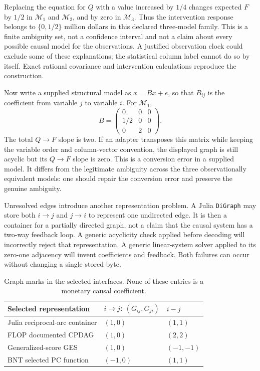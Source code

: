 Replacing the equation for $Q$ with a value increased by $1/4$ changes
expected $F$ by $1/2$ in $\mathcal M_1$ and $\mathcal M_2$, and by zero in
$\mathcal M_3$. Thus the intervention response belongs to
$\{0,1/2\}$ million dollars in this declared three-model family. This is a
finite ambiguity set, not a confidence interval and not a claim about every
possible causal model for the observations. A justified observation clock
could exclude some of these explanations; the statistical column label
cannot do so by itself. Exact rational covariance and intervention
calculations reproduce the construction\citep{exec13_other_exact}.

Now write a supplied structural model as $x=Bx+e$, so that $B_{ij}$ is the
coefficient from variable $j$ to variable $i$. For $\mathcal M_1$,
\[
 B=\begin{pmatrix}0&0&0\\1/2&0&0\\0&2&0\end{pmatrix}.
\]
The total $Q\to F$ slope is two. If an adapter transposes this matrix while
keeping the variable order and column-vector convention, the displayed graph
is still acyclic but its $Q\to F$ slope is zero. This is a conversion error
in a supplied model. It differs from the legitimate ambiguity across the
three observationally equivalent models: one should repair the conversion
error and preserve the genuine ambiguity.

Unresolved edges introduce another representation problem. A Julia
\texttt{DiGraph} may store both $i\to j$ and $j\to i$ to represent one
undirected edge. It is then a container for a partially directed graph, not a
claim that the causal system has a two-way feedback loop. A generic acyclicity
check applied before decoding will incorrectly reject that representation.
A generic linear-system solver applied to its zero-one adjacency will invent
coefficients and feedback. Both failures can occur without changing a single
stored byte.

\begin{table}[htbp]
\centering\small
\begin{tabular}{lll}
\toprule Selected representation & $i\to j$: $(G_{ij},G_{ji})$ & $i-j$\\
\midrule
Julia reciprocal-arc container & $(1,0)$ & $(1,1)$\\
FLOP documented CPDAG & $(1,0)$ & $(2,2)$\\
Generalized-score GES & $(1,0)$ & $(-1,-1)$\\
BNT selected PC function & $(-1,0)$ & $(1,1)$\\
\bottomrule
\end{tabular}
\caption{Graph marks in the selected interfaces. None of these entries is a
monetary causal coefficient.}
\label{tab:exec13-other-encodings}
\end{table}

